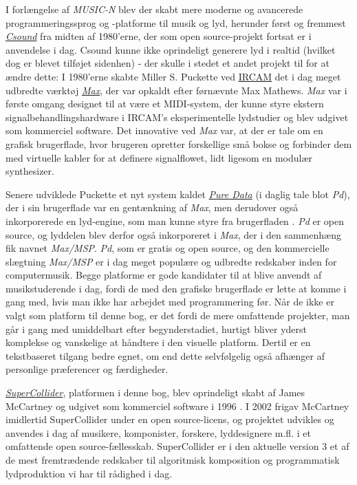 I forlængelse af \textit{MUSIC-N} blev der skabt mere moderne og avancerede programmeringssprog og -platforme til musik og lyd, herunder først og fremmest \href{https://csound.com/}{\textit{Csound}} fra midten af 1980'erne, der som open source-projekt fortsat er i anvendelse i dag. Csound kunne ikke oprindeligt generere lyd i realtid (hvilket dog er blevet tilføjet sidenhen) - der skulle i stedet et andet projekt til for at ændre dette: I 1980'erne skabte Miller S. Puckette ved \href{https://www.ircam.fr/}{IRCAM} det i dag meget udbredte værktøj \href{https://cycling74.com/products/max}{\textit{Max}}, der var opkaldt efter førnævnte Max Mathews. \textit{Max} var i første omgang designet til at være et MIDI-system, der kunne styre ekstern signalbehandlingshardware i IRCAM's eksperimentelle lydstudier og blev udgivet som kommerciel software. Det innovative ved \textit{Max} var, at der er tale om en grafisk brugerflade, hvor brugeren opretter forskellige små bokse og forbinder dem med virtuelle kabler for at definere signalflowet, lidt ligesom en modulær synthesizer.

Senere udviklede Puckette et nyt system kaldet \href{https://puredata.info/}{\textit{Pure Data}} (i daglig tale blot \textit{Pd}), der i sin brugerflade var en gentænkning af \textit{Max}, men derudover også inkorporerede en lyd-engine, som man kunne styre fra brugerfladen \parencite{puckette1996}. \textit{Pd} er open source, og lyddelen blev derfor også inkorporeret i \textit{Max}, der i den sammenhæng fik navnet \textit{Max/MSP}. \textit{Pd}, som er gratis og open source, og den kommercielle slægtning \textit{Max/MSP} er i dag meget populære og udbredte redskaber inden for computermusik. Begge platforme er gode kandidater til at blive anvendt af musikstuderende i dag, fordi de med den grafiske brugerflade er lette at komme i gang med, hvis man ikke har arbejdet med programmering før. Når de ikke er valgt som platform til denne bog, er det fordi de mere omfattende projekter, man går i gang med umiddelbart efter begynderstadiet, hurtigt bliver yderst komplekse og vanskelige at håndtere i den visuelle platform. Dertil er en tekstbaseret tilgang bedre egnet, om end dette selvfølgelig også afhænger af personlige præferencer og færdigheder.

\href{https://supercollider.github.io/}{\textit{SuperCollider}}, platformen i denne bog, blev oprindeligt skabt af James McCartney og udgivet som kommerciel software i 1996 \parencite{mccartney2002}. I 2002 frigav McCartney imidlertid SuperCollider under en open source-licens, og projektet udvikles og anvendes i dag af musikere, komponister, forskere, lyddesignere m.fl. i et omfattende open source-fællesskab. SuperCollider er i den aktuelle version 3 et af de mest fremtrædende redskaber til algoritmisk komposition og programmatisk lydproduktion vi har til rådighed i dag.

